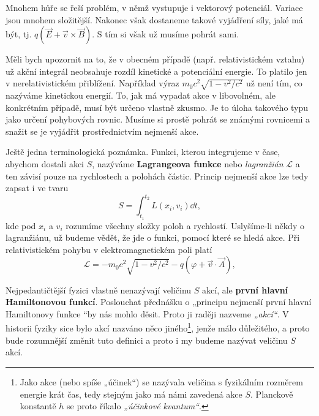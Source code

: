     Mnohem hůře se řeší problém, v němž vystupuje i vektorový potenciál. Variace jsou mnohem
    složitější. Nakonec však dostaneme takové vyjádření síly, jaké má být, tj. \(q(\vec{E} +
    \vec{v}\times \vec{B})\). S tím si však už musíme pohrát sami.

    Měli bych upozornit na to, že v obecném případě (např. relativistickém vztahu) už akční
    integrál neobsahuje rozdíl kinetické a potenciální energie. To platilo jen v nerelativistickém
    přiblížení. Například výraz \(m_0c^2\sqrt{1- v^2/c^2}\) už není tím, co nazýváme kinetickou
    energií. To, jak má vypadat akce v libovolném, ale konkrétním případě, musí být určeno vlastně
    zkusmo. Je to úloha takového typu jako určení pohybových rovnic. Musíme si prostě pohrát se
    známými rovnicemi a snažit se je vyjádřit prostřednictvím nejmenší akce.

    Ještě jedna terminologická poznámka. Funkci, kterou integrujeme v čase, abychom dostali akci
    \(S\), nazýváme \textbf{Lagrangeova funkce} nebo \emph{lagranžián} \(\mathcal{L}\) a ten závisí
    pouze na rychlostech a polohách částic. Princip nejmenší akce lze tedy zapsat i ve tvaru
    \begin{equation*}
      S = \int_{t_1}^{t_2}L(x_i,v_i)\dd{t},
    \end{equation*}
    kde pod \(x_i\) a \(v_i\) rozumíme všechny složky poloh a rychlostí. Uslyšíme-li někdy o
    lagranžiánu, už budeme vědět, že jde o funkci, pomocí které se hledá akce. Při relativistickém
    pohybu v elektromagnetickém poli platí
    \begin{equation*}
      \mathcal{L} = - m_0c^2\sqrt{1 - {v^2}/{c^2}} - q(\varphi + \vec{v}\cdot\vec{A}),
    \end{equation*}

    Nejpedantičtější fyzici vlastně nenazývají veličinu \(S\) akcí, ale \textbf{první hlavní
    Hamiltonovou funkcí}. Poslouchat přednášku o „principu nejmenší první hlavní Hamiltonovy funkce
    “by nás mohlo děsit. Proto ji raději nazveme \emph{„akcí“}. V historii fyziky sice bylo akcí
    nazváno něco jiného\footnote{Jako akce (nebo spíše „účinek“) se nazývala veličina s fyzikálním
    rozměrem energie krát čas, tedy stejným jako má námi zavedená akce \(S\). Planckově konstantě
    \(h\) se proto říkalo \emph{„účinkové kvantum“}.}, jenže málo důležitého, a proto bude
    rozumnější změnit tuto definici a proto i my budeme nazývat veličinu \(S\) akcí.



